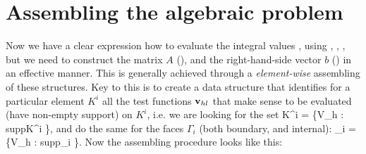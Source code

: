\section{Assembling the algebraic problem}
Now we have a clear expression how to evaluate the integral values ,  using , , , but we need to construct the matrix $A$ (), and the right-hand-side vector $b$ () in an effective manner.
This is generally achieved through a \textit{element-wise} assembling of these structures. Key to this is to create a data structure that identifies for a particular element $K^i$ all the test functions $\mathrm{\mathbf{v}}_{hl}$ that make sense to be evaluated (have non-empty support) on $K^i$, i.e. we are looking for the set
\be
\mrvh \lo K^i \ro = \left\{\mrvh \in V_h : supp\lo\mrvh\ro \cap K^i \neq \emptyset \right\},
\ee
and do the same for the faces $\Gamma_i$ (both boundary, and internal):
\be
\mrvh \lo \Gamma_i \ro = \left\{\mrvh \in V_h : supp\lo\mrvh\ro \cap \Gamma_i \neq \emptyset \right\}.
\ee
Now the assembling procedure looks like this:\\
